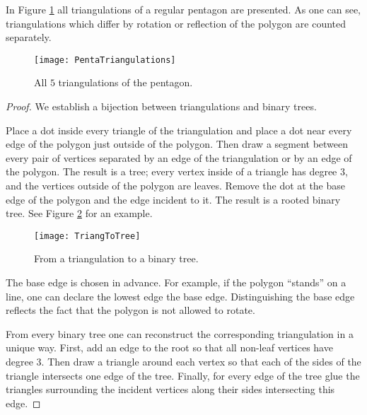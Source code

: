 

\setcounter{section}{4}
\setcounter{subsection}{4}
\setcounter{dfn}{6}

In Figure \ref{fig:PentaTriangulations} all triangulations of a regular pentagon are presented.
As one can see, triangulations which differ by rotation or reflection of the polygon are counted separately.

\begin{figure}[ht]
\begin{center}
\texttt{[image: PentaTriangulations]}
\end{center}
\caption{All $5$ triangulations of the pentagon.}
\label{fig:PentaTriangulations}
\end{figure}


\begin{proof}
We establish a bijection between triangulations and binary trees.

Place a dot inside every triangle of the triangulation and place a dot near every edge of the polygon just outside of the polygon.
Then draw a segment between every pair of vertices separated by an edge of the triangulation or by an edge of the polygon.
The result is a tree; every vertex inside of a triangle has degree $3$, and the vertices outside of the polygon are leaves.
Remove the dot at the base edge of the polygon and the edge incident to it.
The result is a rooted binary tree.
See Figure \ref{fig:TriangToTree} for an example.

\begin{figure}[ht]
\begin{center}
\texttt{[image: TriangToTree]}
\end{center}
\caption{From a triangulation to a binary tree.}
\label{fig:TriangToTree}
\end{figure}

The base edge is chosen in advance.
For example, if the polygon ``stands'' on a line, one can declare the lowest edge the base edge.
Distinguishing the base edge reflects the fact that the polygon is not allowed to rotate.

From every binary tree one can reconstruct the corresponding triangulation in a unique way.
First, add an edge to the root so that all non-leaf vertices have degree $3$.
Then draw a triangle around each vertex so that each of the sides of the triangle intersects one edge of the tree.
Finally, for every edge of the tree glue the triangles surrounding the incident vertices along their sides intersecting this edge.
\end{proof}






